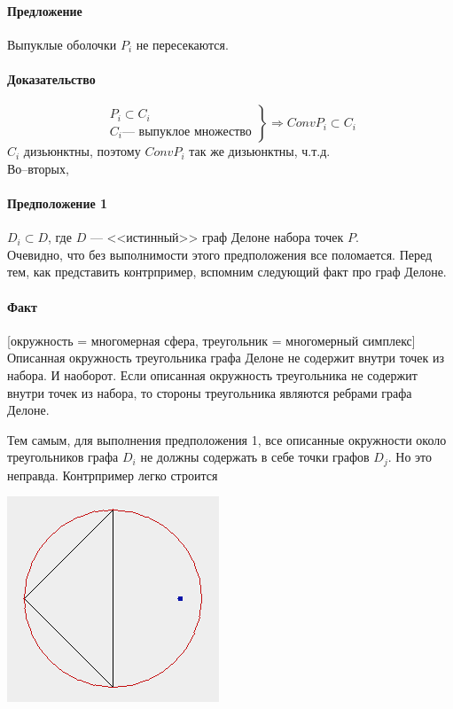 \documentclass{article}
\begin{document}
    \paragraph{Предложение\\}
        Выпуклые оболочки $P_i$ не пересекаются.
    \paragraph{Доказательство\\}
        $$
            \left.
				\begin{array}{c}
					P_i \subset C_i	\\
					C_i \textrm{--- выпуклое множество}
				\end{array}
			\right\}		
			\Longrightarrow 
			Conv P_i \subset C_i
	    $$
	    $C_i$ дизьюнктны, поэтому $Conv P_i$ так же дизьюнктны, ч.т.д. \\  
	    
    Во--вторых,
    
    \paragraph{Предположение 1\\}
        $D_i \subset D$, где $D$ --- <<истинный>> граф Делоне набора точек $P$.\\
        
    Очевидно, что без выполнимости этого предположения все поломается. Перед тем, как представить контрпример, вспомним следующий факт про граф Делоне. 
    \paragraph{Факт\\}    
        [окружность = многомерная сфера, треугольник = многомерный симплекс]    \\
        Описанная окружность треугольника графа Делоне не содержит внутри точек из набора. И наоборот. Если описанная окружность треугольника не содержит внутри точек из набора, то стороны треугольника являются ребрами графа Делоне. 
        
    Тем самым, для выполнения предположения 1, все описанные окружности около треугольников графа $D_i$ не должны содержать в себе точки графов $D_j$. Но это неправда. Контрпример легко строится   
     
    \begin{center}
	    \includegraphics[scale = 0.5]{delaunay1.png}
	\end{center}           
	
\end{document}
